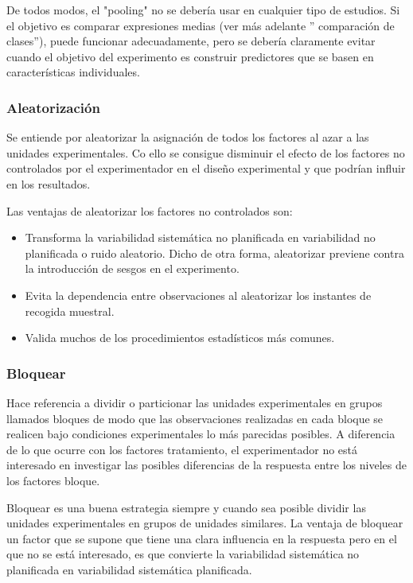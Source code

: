 De todos modos, el "pooling" no se deber\'ia usar en cualquier tipo de estudios.
Si el objetivo es comparar expresiones medias (ver m\'as adelante '' comparaci\'on
de clases''), puede funcionar adecuadamente, pero se deber\'ia claramente evitar
cuando el objetivo del experimento es construir predictores que se basen en
caracter\'isticas individuales.


 \subsubsection{Aleatorizaci\'on}

Se entiende por aleatorizar la asignaci\'on de todos los factores al azar a las unidades experimentales. Co ello se consigue disminuir el efecto de los factores no controlados por el experimentador en el dise\~no experimental y que podr\'ian  influir en los resultados.

Las ventajas de aleatorizar los factores no controlados son:
\begin{itemize}
  \item Transforma la variabilidad sistem\'atica no planificada en variabilidad no planificada o ruido aleatorio. Dicho de otra forma, aleatorizar previene contra la introducci\'on de sesgos en el experimento.
  \item Evita la dependencia entre observaciones al aleatorizar los instantes de recogida muestral.
  \item Valida muchos de los procedimientos estad\'isticos m\'as comunes.
\end{itemize}

\subsubsection{Bloquear}

Hace referencia a dividir o particionar las unidades experimentales en grupos llamados bloques de modo que las observaciones realizadas en cada bloque se realicen bajo condiciones experimentales lo m\'as parecidas posibles.
A diferencia de lo que ocurre con los factores tratamiento, el experimentador no est\'a interesado en investigar las posibles diferencias de la respuesta entre los niveles de los factores bloque.

Bloquear es una buena estrategia siempre y cuando sea posible dividir las unidades experimentales en grupos de unidades similares. La ventaja de bloquear un factor que se supone que tiene una clara influencia en la respuesta pero en el que no se est\'a interesado, es que convierte la variabilidad sistem\'atica no planificada en variabilidad sistem\'atica planificada.


